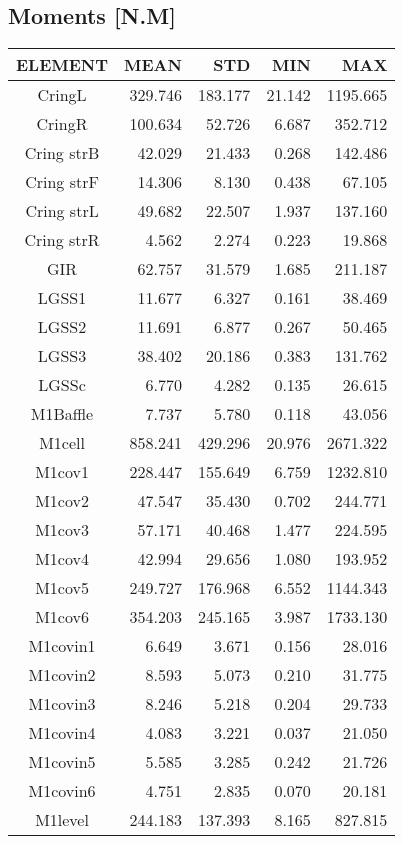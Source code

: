 \subsection{Moments [N.M]}
\begin{longtable}{crrrr}\toprule
 ELEMENT & MEAN & STD & MIN & MAX \\\hline
 CringL & 329.746 & 183.177 & 21.142 & 1195.665 \\
 CringR & 100.634 & 52.726 & 6.687 & 352.712 \\
 Cring strB & 42.029 & 21.433 & 0.268 & 142.486 \\
 Cring strF & 14.306 & 8.130 & 0.438 & 67.105 \\
 Cring strL & 49.682 & 22.507 & 1.937 & 137.160 \\
 Cring strR & 4.562 & 2.274 & 0.223 & 19.868 \\
 GIR & 62.757 & 31.579 & 1.685 & 211.187 \\
 LGSS1 & 11.677 & 6.327 & 0.161 & 38.469 \\
 LGSS2 & 11.691 & 6.877 & 0.267 & 50.465 \\
 LGSS3 & 38.402 & 20.186 & 0.383 & 131.762 \\
 LGSSc & 6.770 & 4.282 & 0.135 & 26.615 \\
 M1Baffle & 7.737 & 5.780 & 0.118 & 43.056 \\
 M1cell & 858.241 & 429.296 & 20.976 & 2671.322 \\
 M1cov1 & 228.447 & 155.649 & 6.759 & 1232.810 \\
 M1cov2 & 47.547 & 35.430 & 0.702 & 244.771 \\
 M1cov3 & 57.171 & 40.468 & 1.477 & 224.595 \\
 M1cov4 & 42.994 & 29.656 & 1.080 & 193.952 \\
 M1cov5 & 249.727 & 176.968 & 6.552 & 1144.343 \\
 M1cov6 & 354.203 & 245.165 & 3.987 & 1733.130 \\
 M1covin1 & 6.649 & 3.671 & 0.156 & 28.016 \\
 M1covin2 & 8.593 & 5.073 & 0.210 & 31.775 \\
 M1covin3 & 8.246 & 5.218 & 0.204 & 29.733 \\
 M1covin4 & 4.083 & 3.221 & 0.037 & 21.050 \\
 M1covin5 & 5.585 & 3.285 & 0.242 & 21.726 \\
 M1covin6 & 4.751 & 2.835 & 0.070 & 20.181 \\
 M1level & 244.183 & 137.393 & 8.165 & 827.815 \\

\end{longtable}
